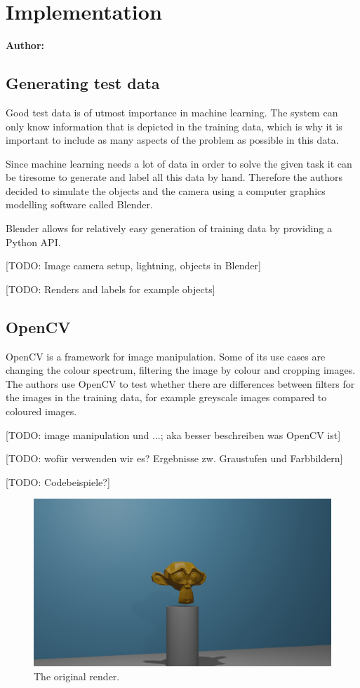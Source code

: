 \chapter{Implementation}

\textbf{Author: } 

\section{Generating test data}
Good test data is of utmost importance in machine learning. The system can only know information that is depicted in the training data, which is why it is important to include as many aspects of the problem as possible in this data.

Since machine learning needs a lot of data in order to solve the given task it can be tiresome to generate and label all this data by hand. Therefore the authors decided to simulate the objects and the camera using a computer graphics modelling software called Blender.

Blender allows for relatively easy generation of training data by providing a Python API.

[TODO: Image camera setup, lightning, objects in Blender]

[TODO: Renders and labels for example objects]

\section{OpenCV}
OpenCV is a framework for image manipulation. Some of its use cases are changing the colour spectrum, filtering the image by colour and cropping images. The authors use OpenCV to test whether there are differences between filters for the images in the training data, for example greyscale images compared to coloured images.

[TODO: image manipulation und ...; aka besser beschreiben was OpenCV ist]

[TODO: wofür verwenden wir es? Ergebnisse zw. Graustufen und Farbbildern]

[TODO: Codebeispiele?]

\begin{figure}[h!]
	\centering
	\includegraphics[width=5in]{img/implementation_opencv_original.png}
	\caption{The original render.}	%
	\label{pic:implementation_opencv_original}
\end{figure}

